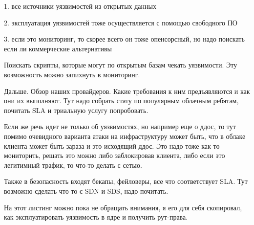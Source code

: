 1. все источники уязвимостей из открытых данных

2. эксплуатация уязвимостей тоже осуществляется с помощью свободного ПО

3. если это мониторинг, то скорее всего он тоже опенсорсный, но надо поискать если ли коммерческие альтернативы

Поискать скрипты, которые могут по открытым базам чекать уязвимости.
Эту возможность можно запихнуть в мониторинг.


Дальше.
Обзор наших провайдеров.
Какие требования к ним предъявляются и как они их выполняют.
Тут надо собрать стату по популярным облачным ребятам, почитать SLA и триальную услугу попробовать.

Если же речь идет не только об уязвимостях, но например еще о ддос, то тут помимо очевидного варианта атаки на инфраструктуру может быть, что в облаке клиента может быть зараза и это исходящий ддос.
Это надо тоже как-то мониторить, решать это можно либо заблокировав клиента, либо если это легитимный трафик, то что-то делать с сетью.

Также в безопасность входят бекапы, фейловеры, все что соответствует SLA.
Тут возможно сделать что-то с SDN и SDS, надо почитать.


На этот листинг можно пока не обращать внимания, я его для себя скопировал, как эксплуатировать уязвимость в ядре и получить рут-права.

